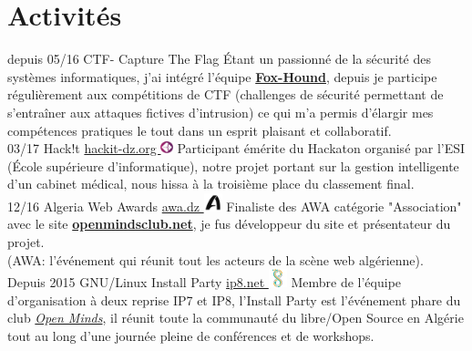 \documentclass[]{friggeri-cv}
\begin{document}
\section{Activités}
\begin{entrylist}
  \entry
    {depuis 05/16}
    {CTF- Capture The Flag}
    {}
    {Étant un passionné de la sécurité des systèmes informatiques, j'ai intégré l'équipe \href{https://web.facebook.com/F0xHo2Nd/}{\textbf{Fox-Hound}}, depuis je participe régulièrement aux compétitions de CTF (challenges de sécurité permettant de s’entraîner aux attaques fictives d’intrusion) ce qui m'a permis d'élargir mes compétences pratiques le tout dans un esprit plaisant et collaboratif.\\}
  \entry
    {03/17}
    {Hack!t}
    {\href{http://www.hackit-dz.org/}{hackit-dz.org  \includegraphics[width=10pt]{images/hackit.png}}}
    {Participant émérite du Hackaton organisé par l'ESI (École supérieure d'informatique), notre projet portant sur la gestion intelligente d'un cabinet médical, nous hissa à la troisième place du classement final.\\}
  \entry
    {12/16}
    {Algeria Web Awards}
    {\href{https://vote.awa.dz/detail/770/}{awa.dz \includegraphics[width=15pt]{images/awa.png}}}
    {Finaliste des AWA catégorie "Association" avec le site \href{http://www.openmindsclub.net/}{\textbf{openmindsclub.net}}, je fus développeur du site et présentateur du projet.\\
    (AWA: l’événement qui réunit tout les acteurs de la scène web algérienne).\\}
  \entry
    {Depuis 2015}
    {GNU/Linux Install Party}
    {\href{https://www.openmindsclub.net/ip8}{ip8.net \includegraphics[width=15pt]{images/favicon8.png}}}
    {Membre de l'équipe d'organisation à deux reprise IP7 et IP8, l'Install Party est l’événement phare du club \href{http://www.openmindsclub.net/}{\emph{Open Minds}}, il réunit toute la communauté du libre/Open Source en Algérie tout au long d'une journée pleine de conférences et de workshops.\\}
    
\end{entrylist}
\end{document}
